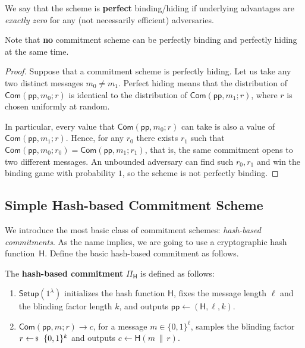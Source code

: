 \documentclass[../../book]{subfiles}
\begin{document}
\begin{remark}
    We say that the scheme is \textbf{perfect} binding/hiding if underlying advantages are \emph{exactly zero} for any (not necessarily efficient) adversaries.
\end{remark}

\begin{remark}
     Note that \textbf{no} commitment scheme can be perfectly binding and perfectly hiding at the same time. 
\end{remark}

\begin{proof}
  Suppose that a commitment scheme is perfectly hiding. 
  Let us take any two distinct messages $m_0 \neq m_1$. Perfect hiding means that the distribution of $\mathsf{Com}(\mathsf{pp}, m_0; r)$ is identical to the distribution of $\mathsf{Com}(\mathsf{pp}, m_1; r)$, where $r$ is chosen uniformly at random.

  In particular, every value that $\mathsf{Com}(\mathsf{pp}, m_0; r)$ can take is also a value of
  $\mathsf{Com}(\mathsf{pp}, m_1; r)$. Hence, for any $r_0$ there exists $r_1$ such that $\mathsf{Com}(\mathsf{pp}, m_0; r_0) = \mathsf{Com}(\mathsf{pp}, m_1; r_1)$, that is, the same commitment opens to two
  different messages. An unbounded adversary can find such $r_0, r_1$ and win the binding game with probability $1$, so the scheme is not perfectly binding.
\end{proof}

\subsection{Simple Hash-based Commitment Scheme}

We introduce the most basic class of commitment schemes: \emph{hash-based commitments}.
As the name implies, we are going to use a cryptographic hash function~\(\mathsf{H}\).
Define the basic hash-based commitment as follows.

\begin{definition}\label{def:hash-based-commitment}
    The \textbf{hash-based commitment} $\Pi_{\mathsf{H}}$ is defined as follows:
    \begin{enumerate}
        \item $\mathsf{Setup}(1^{\lambda})$ initializes the hash function $\mathsf{H}$, fixes the message length $\ell$ and the blinding factor length $k$, and outputs $\mathsf{pp} \gets (\mathsf{H}, \ell, k)$.
        \item $\mathsf{Com}(\mathsf{pp}, m; r) \to c$, for a message $m \in \{0,1\}^{\ell}$, samples the blinding factor $r\leftarrowS\{0,1\}^k$ and outputs $c \gets \mathsf{H}(m \,\|\, r)$.
    \end{enumerate}
\end{definition}
\end{document}
